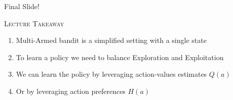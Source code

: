 \documentclass{beamer}
\newenvironment{takeaway}[1]{%
\definecolor{shadecolor}{gray}{0.9}%
	\begin{shaded}{\color{skymagenta}\noindent\textsc{#1}}\\%
	}{%
	\end{shaded}%
}
\begin{document}
\begin{frame}{Final Slide!}
	\begin{takeaway}{Lecture Takeaway}
		\begin{enumerate}
		    \item Multi-Armed bandit is a simplified setting with a single state
		    \item To learn a policy we need to balance Exploration and Exploitation
			\item We can learn the policy by leveraging action-values estimates $Q(a)$
			\item Or by leveraging action preferences $H(a)$
		\end{enumerate}
	\end{takeaway}
\end{frame}
\end{document}
